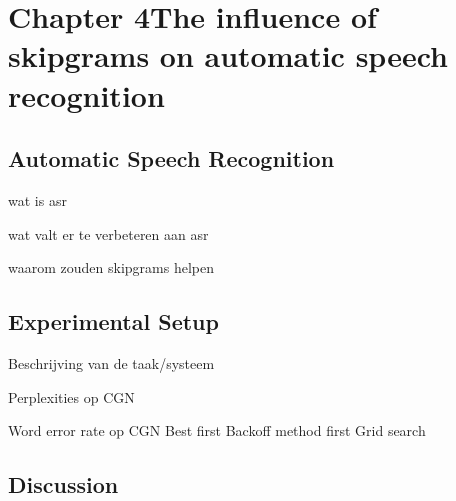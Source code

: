 \chapter{Chapter 4\newline The influence of skipgrams on automatic speech recognition}\label{ch:speech}

\section{Automatic Speech Recognition}

wat is asr

wat valt er te verbeteren aan asr

waarom zouden skipgrams helpen

\section{Experimental Setup}

Beschrijving van de taak/systeem

Perplexities op CGN

Word error rate op CGN
	Best first
	Backoff method first
	Grid search

\section{Discussion}

